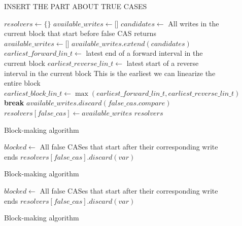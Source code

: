 \documentclass[oneside, a4paper, onecolumn, 10pt]{article}
\begin{document}
\newpage
\begin{figure}[h]
  \begin{algorithmic}

    \State INSERT THE PART ABOUT TRUE CASES

    \State $resolvers \gets \texttt{\{\}}$
    \State $available\_writes \gets \texttt{[]}$
    \State $candidates \gets$ All writes in the current block that start before false CAS returns
    \State $available\_writes \gets \texttt{[]}$
    \EndIf
    \State $available\_writes.extend(candidates)$
    \State $earliest\_forward\_lin\_t \gets$ latest end of a forward interval in the current block
    \State $earliest\_reverse\_lin\_t \gets$ latest start of a reverse interval in the current block
    \State 
    \State \Comment This is the earliest we can linearize the entire block
    \State $earliest\_block\_lin\_t \gets \max(earliest\_forward\_lin\_t, earliest\_reverse\_lin\_t)$
    \State \textbf{break}
    \EndIf
    \EndFor
    \State
    \State $available\_writes.discard(false\_cas.compare)$ 
    \State $resolvers[false\_cas] \gets available\_writes$
    \EndFor
    \State \Return $resolvers$
    \EndFunction
  \end{algorithmic}
  \caption{Block-making algorithm}
\end{figure}

\begin{figure}[h]
  \begin{algorithmic}
    \State $blocked \gets$ All false CASes that start after their corresponding write ends
    \State $resolvers[false\_cas].discard(var)$
    \EndIf
    \EndFor
    \EndFor
    \EndFunction
  \end{algorithmic}
  \caption{Block-making algorithm}
\end{figure}

\begin{figure}[h]
  \begin{algorithmic}
    \State $blocked \gets$ All false CASes that start after their corresponding write ends
    \State $resolvers[false\_cas].discard(var)$
    \EndIf
    \EndFor
    \EndFor
    \EndFunction
  \end{algorithmic}
  \caption{Block-making algorithm}
\end{figure}
\end{document}
